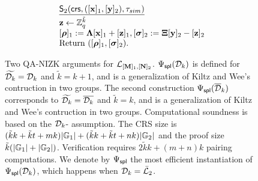 \begin{figure}
$$\begin{array}{l}
\\
\begin{array}{l}
    \underline{\mathsf{S}_2(\mathsf{crs},([\mathbf{x}]_1,[\mathbf{y}]_2),\tau_{sim})}\\[.1cm]
    \mathbf{z} \gets \mathbb{Z}_q^{\tilde{k}} \\ 
    {[{\boldsymbol \rho}]_1:=\mathbf{{\Lambda}} [\mathbf{x}]_1+ [\mathbf{z}]_1},{[{\boldsymbol \sigma}]_2:=\mathbf{{\Xi}} [\mathbf{y}]_2- [\mathbf{z}]_2}\\
    {\text{Return }  ([{\boldsymbol \rho}]_1,[{\boldsymbol \sigma}]_2).}
\end{array}
\\
\end{array}
$$
\caption{Two QA-NIZK arguments for  $\mathcal{L}_{[\mathbf{{M}}]_1,[\mathbf{{N}}]_2}$. ${\Psi_{\mathsf{spl}}(\mathcal{D}_k)}$ is 
 defined for $\widetilde{\mathcal{D}_{k}}=\mathcal{D}_k$ and $\tilde{k}=k+1$, and is a generalization of Kiltz and Wee's contruction \cite[Section~3.1]{EC:KilWee15}  in two groups. The second construction ${\Psi_\mathsf{spl}(\overline{\mathcal{D}}_k)}$ corresponds to $\widetilde{\mathcal{D}_{k}}=\overline{\mathcal{D}_k}$ and $\tilde{k}=k$, and is a generalization of Kiltz and Wee's contruction \cite[Section~3.2]{EC:KilWee15} in two groups. Computational soundness is based on the $\mathcal{D}_{k}$-\skermdh{} assumption. The CRS size is $(\tilde{k}k+\tilde{k}t+mk)|\mathbb{G}_1|+(\tilde{k}k+\tilde{k}t+nk)|\mathbb{G}_2|$ and the proof size $\tilde{k}(|\mathbb{G}_1|+|\mathbb{G}_2|)$. Verification requires $2\tilde{k}k+(m+n)k$ pairing computations. We denote by $\Psi_{\mathsf{spl}}$ the most efficient instantiation of ${\Psi_{\mathsf{spl}}(\mathcal{D}_k)}$, which happens when $\mathcal{D}_k=\bar{\mathcal{L}}_2$. \label{fig:QANIZKtwogroups} }
\end{figure}

